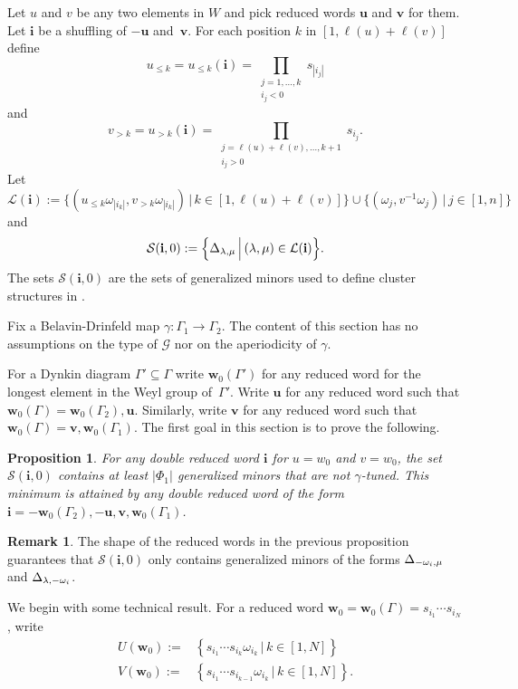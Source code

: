 \documentclass[a4paper]{amsart}
\newtheorem{proposition}[theorem]{Proposition}
\theoremstyle{definition}
\newtheorem{remark}[theorem]{Remark}
\newcommand{\mcG}{\mathcal{G}}
\newcommand{\mcL}{\mathcal{L}}
\newcommand{\mcS}{\mathcal{S}}
\newcommand{\bfi}{\mathbf{i}}
\newcommand{\bfu}{\mathbf{u}}
\newcommand{\bfv}{\mathbf{v}}
\newcommand{\bfw}{\mathbf{w}}
\begin{document}
Let $u$ and $v$ be any two elements in $W$ and pick reduced words $\bfu$ and $\bfv$ for them.
Let $\bfi$ be a shuffling of $-\bfu$ and~$\bfv$.
For each position $k$ in $[1, \ell(u)+\ell(v)]$ define
\[
  u_{\leq k}
  =
  u_{\leq k}(\bfi)
  =
  \prod_{\substack{j= 1,\dots,k \\ i_j < 0}} s_{|i_j|}
\]
and
\[
  v_{> k}
  =
  u_{> k}(\bfi)
  =
  \prod_{\substack{j = \ell(u)+\ell(v),\dots,k+1 \\ i_j > 0}} s_{i_j}.
\]
Let
\[
  \mcL(\bfi)
  :=
  \Big\{
    (u_{\leq k} \omega_{|i_k|},v_{> k}\omega_{|i_k|}) \, \Big| \, k\in[1,\ell(u)+\ell(v)]
  \Big\}
  \cup
  \Big\{(\omega_j,v^{-1}\omega_j) \,\Big|\, j \in [1,n] \Big\}
\]
and
\[
  \mcS(\bfi,0)
  :=
  \Big\{
    \minor[\lambda][\mu] \,\Big|\, (\lambda,\mu) \in \mcL(\bfi)
  \Big\}.
\]
The sets $\mcS(\bfi,0)$ are the sets of generalized minors used to define cluster structures in \cite{BFZ05}.

Fix a Belavin-Drinfeld map $\gamma:\Gamma_1\rightarrow\Gamma_2$.
The content of this section has no assumptions on the type of $\mcG$ nor on the aperiodicity of $\gamma$.

For a Dynkin diagram $\Gamma'\subseteq\Gamma$ write $\bfw_0(\Gamma')$ for any reduced word for the longest element in the Weyl group of~$\Gamma'$.
Write $\bfu$ for any reduced word such that $\bfw_0(\Gamma) = \bfw_0(\Gamma_2), \bfu$.
Similarly, write $\bfv$ for any reduced word such that $\bfw_0(\Gamma) = \bfv, \bfw_0(\Gamma_1)$.
The first goal in this section is to prove the following.
\begin{proposition}
  \label{prop: max compatible}
  For any double reduced word $\bfi$ for $u=w_0$ and $v=w_0$, the set $\mcS(\bfi,0)$ contains at least $|\Phi_1|$ generalized minors that are not $\gamma$-tuned.
  This minimum is attained by any double reduced word of the form $\bfi = -\bfw_0(\Gamma_2), -\bfu, \bfv, \bfw_0(\Gamma_1)$.
\end{proposition}

\begin{remark}
  The shape of the reduced words in the previous proposition guarantees that $\mcS(\bfi,0)$ only contains generalized minors of the forms $\minor[-\omega_i][\mu]$ and $\minor[\lambda][-\omega_i]$.
\end{remark}

We begin with some technical result.
For a reduced word $\bfw_0=\bfw_0(\Gamma)=s_{i_1}\cdots s_{i_N}$, write
\begin{align*}
  U(\bfw_0):=&\left\{s_{i_1}\cdots s_{i_k}\omega_{i_k} \,|\, k\in[1,N]\right\}\\
  V(\bfw_0):=&\left\{s_{i_1}\cdots s_{i_{k-1}}\omega_{i_k} \,|\, k\in[1,N]\right\}.
\end{align*}
\end{document}
